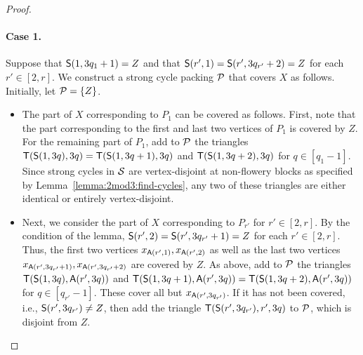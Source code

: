 \begin{proof}
  \paragraph*{Case 1.}
  Suppose that $\mathsf{S}(1, 3q_1 + 1) = Z$ and that $\mathsf{S}(r', 1) = \mathsf{S}(r', 3q_{r'} + 2) =  Z$ for each $r' \in [2, r]$. 
  We construct a strong cycle packing $\mathcal P$ that covers $X$ as follows.
  Initially, let $\mathcal P = \{ Z \}$.
  \begin{itemize}
    \item 
    The part of $X$ corresponding to $P_1$ can be covered as follows.
    First, note that the part corresponding to the first and last two vertices of $P_1$ is covered by $Z$.
    For the remaining part of $P_1$, add to $\mathcal P$ the triangles $\mathsf{T}(\mathsf{S}(1, 3q), 3q) = \mathsf{T}(\mathsf{S}(1, 3q+1), 3q)$ and $\mathsf{T}(\mathsf{S}(1, 3q+2), 3q)$ for $q \in [q_1 - 1]$.
    Since strong cycles in $\mathcal S$ are vertex-disjoint at non-flowery blocks as specified by Lemma~\ref{lemma:2mod3:find-cycles}, any two of these triangles are either identical or entirely vertex-disjoint.
    \item
    Next, we consider the part of $X$ corresponding to $P_{r'}$ for $r' \in [2, r]$.
    By the condition of the lemma, $\mathsf{S}(r', 2) = \mathsf{S}(r', 3q_{r'} + 1) =  Z$ for each $r' \in [2, r]$.
    Thus, the first two vertices $x_{\mathsf{A}(r',1)}, x_{\mathsf{A}(r', 2)}$ as well as the last two vertices $x_{\mathsf{A}(r', 3q_{r'} + 1)}, x_{\mathsf{A}(r', 3q_{r'} + 2)}$ are covered by $Z$.
    As above, add to $\mathcal P$ the triangles $\mathsf{T}(\mathsf{S}(1, 3q), \mathsf{A}(r', 3q))$ and  $\mathsf{T}(\mathsf{S}(1, 3q+1), \mathsf{A}(r', 3q)) = \mathsf{T}(\mathsf{S}(1, 3q+2), \mathsf{A}(r', 3q))$ for $q \in [q_{r'} - 1]$.
    These cover all but $x_{\mathsf{A}(r', 3q_{r'})}$.
    If it has not been covered, i.e., $\mathsf{S}(r', 3q_{r'}) \ne Z$, then add the triangle $\mathsf{T}(\mathsf{S}(r', 3q_{r'}), r', 3q)$ to $\mathcal P$, which is disjoint from $Z$.
  \end{itemize}


\end{proof}
